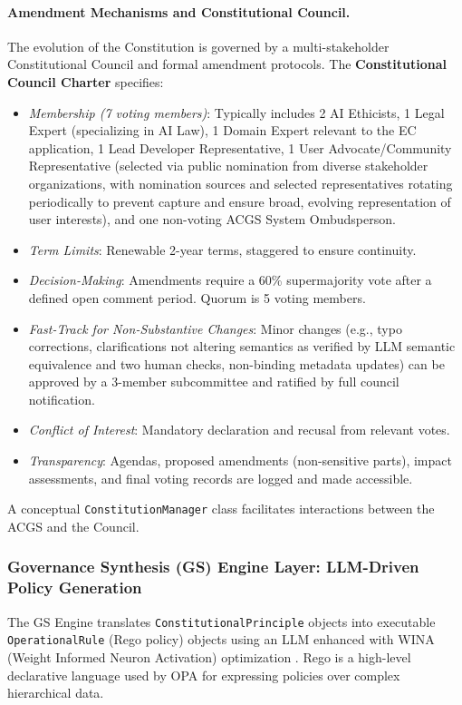 \documentclass[manuscript,screen,review,anonymous,9pt]{acmart}
\begin{document}
\paragraph{Amendment Mechanisms and Constitutional Council.} The evolution of the Constitution is governed by a multi-stakeholder Constitutional Council and formal amendment protocols.
The \textbf{Constitutional Council Charter} specifies:
\begin{itemize}[leftmargin=*,itemsep=1pt,parsep=1pt]
    \item \textit{Membership (7 voting members)}: Typically includes 2 AI Ethicists, 1 Legal Expert (specializing in AI Law), 1 Domain Expert relevant to the EC application, 1 Lead Developer Representative, 1 User Advocate/Community Representative (selected via public nomination from diverse stakeholder organizations, with nomination sources and selected representatives rotating periodically to prevent capture and ensure broad, evolving representation of user interests), and one non-voting ACGS System Ombudsperson.
    \item \textit{Term Limits}: Renewable 2-year terms, staggered to ensure continuity.
    \item \textit{Decision-Making}: Amendments require a 60\% supermajority vote after a defined open comment period. Quorum is 5 voting members.
    \item \textit{Fast-Track for Non-Substantive Changes}: Minor changes (e.g., typo corrections, clarifications not altering semantics as verified by LLM semantic equivalence and two human checks, non-binding metadata updates) can be approved by a 3-member subcommittee and ratified by full council notification.
    \item \textit{Conflict of Interest}: Mandatory declaration and recusal from relevant votes.
    \item \textit{Transparency}: Agendas, proposed amendments (non-sensitive parts), impact assessments, and final voting records are logged and made accessible.
\end{itemize}
A conceptual \texttt{ConstitutionManager} class facilitates interactions between the ACGS and the Council.

\subsubsection{Governance Synthesis (GS) Engine Layer: LLM-Driven Policy Generation}
\label{subsubsec:gs_engine_layer}
The GS Engine translates \texttt{ConstitutionalPrinciple} objects into executable \texttt{OperationalRule} (Rego policy) objects using an LLM enhanced with WINA (Weight Informed Neuron Activation) optimization \cite{WINA2024NeuronActivation}. Rego is a high-level declarative language used by OPA for expressing policies over complex hierarchical data.
\end{document}
